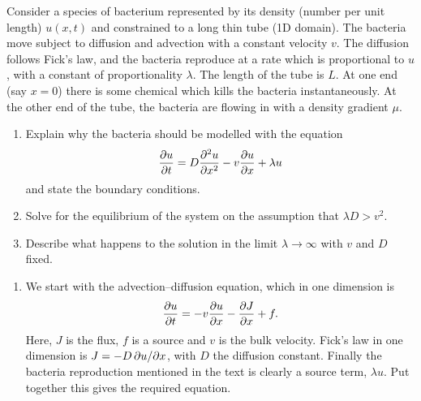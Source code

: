 \documentclass[a4paper, 12pt]{article}
\begin{document}
\begin{enumerate}[label={\bf \arabic{*}.\;}, ref={\arabic{*}},itemsep=3ex, left=0ex]
    {
      Consider a species of bacterium represented by its density (number per unit length) $u(x,t)$ and constrained to a long thin tube (1D domain).  The bacteria move subject to diffusion and advection with a constant velocity $v$. The diffusion follows Fick's law, and the bacteria reproduce at a rate which is proportional to $u$, with a constant of proportionality $\lambda$. The length of the tube is $L$. At one end (say $x=0$) there is some chemical which kills the bacteria instantaneously. At the other end of the tube, the bacteria are flowing in with a density gradient $\mu$.
      \begin{enumerate}[label=(\alph*)]
        \item Explain why the bacteria should be modelled with the equation
          \begin{equation}
            \pd{u}{t} = D\pdd{u}{x} - v\pd{u}{x}+\lambda u
          \end{equation}
          and state the boundary conditions.
        \item Solve for the equilibrium of the system on the assumption that $\lambda D> v^2$.
        \item Describe what happens to the solution in the limit $\lambda \rightarrow \infty$ with $v$ and $D$ fixed.
      \end{enumerate}
    }
    {
      \begin{enumerate}[label=(\alph*)]
        \item{
            We start with the advection--diffusion equation, which in one dimension is
            \begin{equation}
              \pd{u}{t} = -v\pd{u}{x} - \pd{J}{x} + f.
            \end{equation}
            Here, $J$ is the flux, $f$ is a source and $v$ is the bulk velocity. Fick's law in one dimension is $J = -D\,\pd{u}{x}$, with $D$ the diffusion constant.  Finally the bacteria reproduction mentioned in the text is clearly a source term, $\lambda u$. Put together this gives the required equation.

}
\end{enumerate}}
\end{enumerate}
\end{document}

